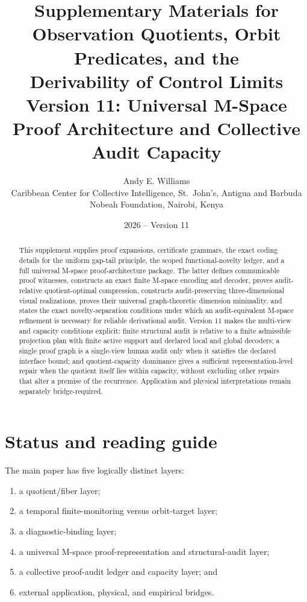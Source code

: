 \documentclass[11pt]{article}
\title{Supplementary Materials for\\
\large Observation Quotients, Orbit Predicates, and the\\
Derivability of Control Limits\\[2pt]
\large Version 11: Universal M-Space Proof Architecture and Collective Audit Capacity}
\author{Andy E. Williams\\[3pt]
\small Caribbean Center for Collective Intelligence, St.~John's, Antigua and Barbuda\\
\small Nobeah Foundation, Nairobi, Kenya}
\date{2026 -- Version 11}
\theoremstyle{plain}
\theoremstyle{definition}
\theoremstyle{remark}
\begin{document}
\maketitle

\begin{abstract}
This supplement supplies proof expansions, certificate grammars, the exact
coding details for the uniform gap-tail principle, the scoped
functional-novelty ledger, and a full universal M-space proof-architecture
package.  The latter defines communicable proof witnesses, constructs an exact
finite M-space encoding and decoder, proves audit-relative quotient-optimal
compression, constructs audit-preserving three-dimensional visual
realizations, proves their universal graph-theoretic dimension minimality, and
states the exact novelty-separation conditions under which an
audit-equivalent M-space refinement is necessary for reliable derivational
audit.  Version 11 makes the multi-view and capacity conditions explicit:
finite structural audit is relative to a finite admissible projection plan with
finite active support and declared local and global decoders; a single proof
graph is a single-view human audit only when it satisfies the declared
interface bound; and quotient-capacity dominance gives a sufficient
representation-level repair when the quotient itself lies within capacity,
without excluding other repairs that alter a premise of the recurrence.
Application and physical interpretations remain separately bridge-required.
\end{abstract}

\tableofcontents

\section{Status and reading guide}
\label{sec:status}

The main paper has five logically distinct layers:
\begin{enumerate}[label=\textbf{L\arabic*.},leftmargin=2.6em]
\item a quotient/fiber layer;
\item a temporal finite-monitoring versus orbit-target layer;
\item a diagnostic-binding layer;
\item a universal M-space proof-representation and structural-audit layer;
\item a collective proof-audit ledger and capacity layer; and
\item external application, physical, and empirical bridges.
\end{enumerate}
\end{document}
